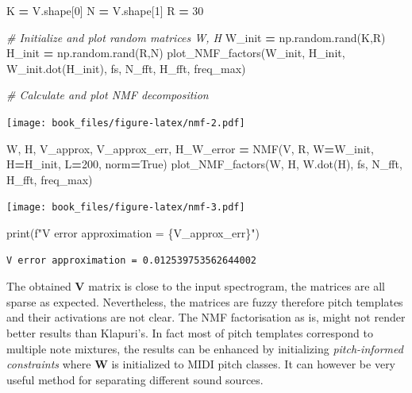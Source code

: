 \documentclass[american,]{article}
\newenvironment{Shaded}{\begin{snugshade}}{\end{snugshade}}
\newcommand{\BuiltInTok}[1]{#1}
\newcommand{\CommentTok}[1]{\textcolor[rgb]{0.56,0.35,0.01}{\textit{#1}}}
\newcommand{\DecValTok}[1]{\textcolor[rgb]{0.00,0.00,0.81}{#1}}
\newcommand{\NormalTok}[1]{#1}
\newcommand{\OperatorTok}[1]{\textcolor[rgb]{0.81,0.36,0.00}{\textbf{#1}}}
\newcommand{\SpecialCharTok}[1]{\textcolor[rgb]{0.00,0.00,0.00}{#1}}
\newcommand{\SpecialStringTok}[1]{\textcolor[rgb]{0.31,0.60,0.02}{#1}}
\newcommand{\VariableTok}[1]{\textcolor[rgb]{0.00,0.00,0.00}{#1}}
\begin{document}
\begin{Shaded}
\begin{Highlighting}[]
\NormalTok{K }\OperatorTok{=}\NormalTok{ V.shape[}\DecValTok{0}\NormalTok{]}
\NormalTok{N }\OperatorTok{=}\NormalTok{ V.shape[}\DecValTok{1}\NormalTok{]}
\NormalTok{R }\OperatorTok{=} \DecValTok{30}

\CommentTok{# Initialize and plot random matrices W, H}
\NormalTok{W_init }\OperatorTok{=}\NormalTok{ np.random.rand(K,R)}
\NormalTok{H_init }\OperatorTok{=}\NormalTok{ np.random.rand(R,N)}
\NormalTok{plot_NMF_factors(W_init, H_init, W_init.dot(H_init), fs, N_fft, H_fft, freq_max)}

\CommentTok{# Calculate and plot NMF decomposition}
\end{Highlighting}
\end{Shaded}

\texttt{[image: book\_files/figure-latex/nmf-2.pdf]}

\begin{Shaded}
\begin{Highlighting}[]
\NormalTok{W, H, V_approx, V_approx_err, H_W_error }\OperatorTok{=}\NormalTok{ NMF(V, R, W}\OperatorTok{=}\NormalTok{W_init, H}\OperatorTok{=}\NormalTok{H_init, L}\OperatorTok{=}\DecValTok{200}\NormalTok{, norm}\OperatorTok{=}\VariableTok{True}\NormalTok{)}
\NormalTok{plot_NMF_factors(W, H, W.dot(H), fs, N_fft, H_fft, freq_max)               }
\end{Highlighting}
\end{Shaded}

\texttt{[image: book\_files/figure-latex/nmf-3.pdf]}

\begin{Shaded}
\begin{Highlighting}[]
\BuiltInTok{print}\NormalTok{(}\SpecialStringTok{f"V error approximation = }\SpecialCharTok{\{}\NormalTok{V_approx_err}\SpecialCharTok{\}}\SpecialStringTok{"}\NormalTok{)}
\end{Highlighting}
\end{Shaded}

\begin{verbatim}
V error approximation = 0.012539753562644002
\end{verbatim}

The obtained \(\boldsymbol{V}\) matrix is close to the input spectrogram,
the matrices are all sparse as expected.
Nevertheless, the matrices are fuzzy therefore pitch templates
and their activations are not clear.
The NMF factorisation as is, might not render better results than Klapuri's.
In fact most of pitch templates correspond to multiple note mixtures,
the results can be enhanced by initializing \emph{pitch-informed constraints}
where \(\boldsymbol{W}\) is initialized to MIDI pitch classes.
It can however be very useful method for separating different sound sources.
\end{document}
